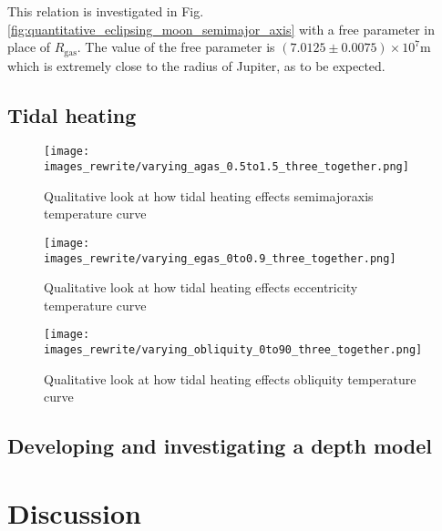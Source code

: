 \documentclass[12pt, onecolumn]{revtex4-2}    %
\begin{document}
This relation is investigated in Fig. \ref{fig:quantitative_eclipsing_moon_semimajor_axis} with a free parameter in place of $R_\text{gas}$.
The value of the free parameter is $(7.0125\pm 0.0075) \times 10^7 \text{m}$ which is extremely close to the radius of Jupiter, as to be expected.

\subsection{Tidal heating} \label{ssec:InvTidalHeating}
\begin{figure}
  \texttt{[image: images\_rewrite/varying\_agas\_0.5to1.5\_three\_together.png]}
  \caption{
    Qualitative look at how tidal heating effects semimajoraxis temperature curve
  }
  \label{fig:qualitative_tidalheating_semimajoraxis}
\end{figure}

\begin{figure}
  \texttt{[image: images\_rewrite/varying\_egas\_0to0.9\_three\_together.png]}
  \caption{
    Qualitative look at how tidal heating effects eccentricity temperature curve
  }
  \label{fig:qualitative_tidalheating_eccentrcity}
\end{figure}

\begin{figure}
  \texttt{[image: images\_rewrite/varying\_obliquity\_0to90\_three\_together.png]}
  \caption{
    Qualitative look at how tidal heating effects obliquity temperature curve
  }
  \label{fig:qualitative_tidalheating_obliquity}
\end{figure}




\subsection{Developing and investigating a depth model} \label{ssec:DevInvDepthModel} %

\section{Discussion} \label{sec:Discussion}
\end{document}
